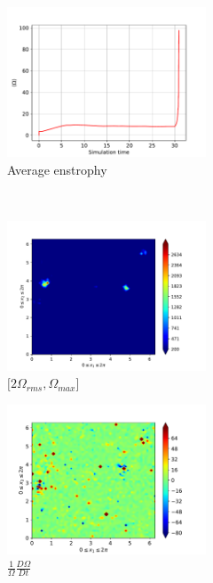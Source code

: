 \begin{figure}[H]
    \begin{subfigure}[H]{0.45\textwidth}
        \includegraphics[height=1.75in]{media/run-cds-65/enst-average1440}
        \caption{Average enstrophy}
    \end{subfigure}
    ~
    \begin{subfigure}[H]{0.45\textwidth}
        \includegraphics[height=1.75in]{media/run-cds-65/enst-2-1440}
        \caption{$[2\Omega_{rms}, \Omega_{max} $] }
    \end{subfigure}
    \newline
    \begin{subfigure}[H]{0.45\textwidth}
        \includegraphics[height=1.75in]{media/run-cds-65/enst-1440}
        \caption{$\frac{1}{\Omega} \frac{D \Omega}{Dt}$}
    \end{subfigure}
    ~
    \begin{subfigure}{0.45\textwidth}

\end{subfigure}
\end{figure}
